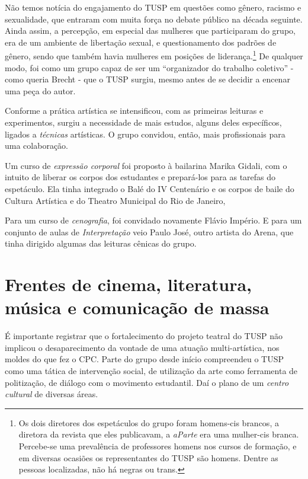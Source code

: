 Não temos notícia do engajamento do TUSP em questões como gênero,
racismo e sexualidade, que entraram com muita força no debate público na
década seguinte. Ainda assim, a percepção, em especial das mulheres que
participaram do grupo, era de um ambiente de libertação sexual, e
questionamento dos padrões de gênero, sendo que também havia mulheres em
posições de liderança.\footnote{Os dois diretores dos espetáculos do
  grupo foram homens-cis brancos, a diretora da revista que eles
  publicavam, a \textit{aParte} era uma mulher-cis branca. Percebe-se uma
  prevalência de professores homens nos cursos de formação, e em
  diversas ocasiões os representantes do TUSP são homens. Dentre as
  pessoas localizadas, não há negras ou trans.} De qualquer modo, foi
como um grupo capaz de ser um “organizador do trabalho coletivo” - como
queria Brecht - que o TUSP surgiu, mesmo antes de se decidir a encenar
uma peça do autor.

Conforme a prática artística se intensificou, com as primeiras leituras
e experimentos, surgiu a necessidade de mais estudos, alguns deles
específicos, ligados a \textit{técnicas} artísticas. O grupo convidou,
então, mais profissionais para uma colaboração.

Um curso de \textit{expressão corporal} foi proposto à bailarina Marika
Gidali, com o intuito de liberar os corpos dos estudantes e prepará-los
para as tarefas do espetáculo. Ela tinha integrado o Balé do IV
Centenário e os corpos de baile do Cultura Artística e do Theatro
Municipal do Rio de Janeiro,

Para um curso de \textit{cenografia}, foi convidado novamente Flávio
Império. E para um conjunto de aulas de \textit{Interpretação} veio Paulo
José, outro artista do Arena, que tinha dirigido algumas das leituras
cênicas do grupo.

\section{Frentes de cinema, literatura, música e comunicação de massa}

É importante registrar que o fortalecimento do projeto teatral do TUSP
não implicou o desaparecimento da vontade de uma atuação
multi-artística, nos moldes do que fez o CPC. Parte do grupo desde
início compreendeu o TUSP como uma tática de intervenção social, de
utilização da arte como ferramenta de politização, de diálogo com o
movimento estudantil. Daí o plano de um \textit{centro cultural} de
diversas áreas.

